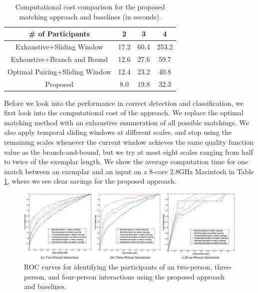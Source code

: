 \begin{table}[ht]
\centering \caption{Computational cost comparison for the proposed matching approach and baselines (in seconds).}
\footnotesize{
\begin{tabular}{|c|c|c|c|}
\hline    \# of Participants &  2  &  3  &  4   \\
\hline   Exhaustive+Sliding Window & 17.2   & 60.4   & 253.2   \\
\hline  Exhaustive+Branch and Bound &  12.6 &  27.6  &   59.7 \\
\hline  Optimal Pairing+Sliding Window & 12.4  & 23.2   &  40.8  \\
\hline  Proposed & 8.0  &  19.8  &  32.3  \\
\hline 
\end{tabular}
}
\label{computecost}
\end{table}


Before we look into the performance in correct detection and classification, we first look into the computational cost of the approach. We replace the optimal matching method with an exhaustive enumeration of all possible matchings. We also apply temporal sliding windows at different scales, and stop using the remaining scales whenever the current window achieves the same quality function value as the branch-and-bound, but we try at most eight scales ranging from half to twice of the exemplar length. We show the average computation time for one match between an exemplar and an input on a 8-core 2.8GHz Macintosh in Table \ref{computecost}, where we see clear savings for the proposed approach.


\begin{figure}[t]
\begin{center}
\includegraphics[scale=2.5]{ROC.png}
\end{center}
\caption{ROC curves for identifying the participants of an two-person, three-person, and four-person interactions using the proposed approach and baselines. }
\label{ROC}
\end{figure}

